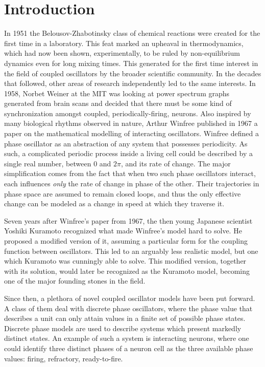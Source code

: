 \chapter*{Introduction}

In 1951 the Belousov-Zhabotinsky class of chemical reactions were created for the first time in a laboratory. This feat marked an
upheaval in thermodynamics, which had now been shown, experimentally, to be ruled by non-equilibrium dynamics even for long mixing
times. This generated for the first time interest in the field of coupled oscillators by the broader scientific community. In the
decades that followed, other areas of research independently led to the same interests. In 1958, Norbet Weiner at the MIT was looking
at power spectrum graphs generated from brain scans and decided that there must be some kind of synchronization amongst coupled,
periodically-firing, neurons. Also inspired by many biological rhythms observed in nature, Arthur Winfree published in 1967 a paper on
the mathematical modelling of interacting oscillators. Winfree defined a phase oscillator as an abstraction of any system that
possesses periodicity. As such, a complicated periodic process inside a living cell could be described by a single real number, between
$0$ and $2\pi$, and its rate of change. The major simplification comes from the fact that when two such phase oscillators interact,
each influences \textit{only} the rate of change in phase of the other. Their trajectories in phase space are assumed to remain closed
loops, and thus the only effective change can be modeled as a change in speed at which they traverse it.

Seven years after Winfree's paper from 1967, the then young Japanese scientist Yoshiki Kuramoto recognized what made Winfree's model
hard to solve. He proposed a modified version of it, assuming a particular form for the coupling function between oscillators. This led
to an arguably less realistic model, but one which Kuramoto was cunningly able to solve. This modified version, together with its
solution, would later be recognized as the Kuramoto model, becoming one of the major founding stones in the field.

Since then, a plethora of novel coupled oscillator models have been put forward. A class of them deal with discrete phase oscillators,
where the phase value that describes a unit can only attain values in a finite set of possible phase states. Discrete phase models are
used to describe systems which present markedly distinct states. An example of such a system is interacting neurons, where one could
identify three distinct phases of a neuron cell as the three available phase values: firing, refractory, ready-to-fire.


